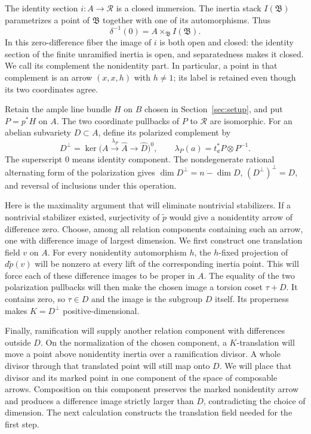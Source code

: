 The identity section \(i:A\to\mathcal R\) is a closed immersion.
The inertia stack \(I(\mathfrak B)\) parametrizes a point of
\(\mathfrak B\) together with one of its automorphisms.  Thus
\[
                   \delta^{-1}(0)
                       =A\times_{\mathfrak B}I(\mathfrak B).
\]
In this zero-difference fiber the image of \(i\) is both open and
closed: the identity section of the finite unramified inertia is
open, and separatedness makes it closed.  We call its complement
the nonidentity part.  In particular, a point in that complement is
an arrow \((x,x,h)\) with \(h\ne1\); its label is retained even though
its two coordinates agree.

Retain the ample line bundle \(H\) on \(B\) chosen in
Section~\ref{sec:setup}, and put \(P=p^*H\) on \(A\).  The two
coordinate pullbacks of \(P\) to \(\mathcal R\) are isomorphic.
For an abelian subvariety \(D\subset A\), define its polarized
complement by
\begin{equation}\label{quot:orthogonal}
 D^\perp
   =\ker\bigl(A\xrightarrow{\lambda_P}\widehat A
                      \longrightarrow\widehat D\bigr)^0,
 \qquad
 \lambda_P(a)=t_a^*P\otimes P^{-1}.
\end{equation}
The superscript \(0\) means identity component.  The nondegenerate
rational alternating form of the polarization gives
\(\dim D^\perp=n-\dim D\), \((D^\perp)^\perp=D\), and reversal of
inclusions under this operation.

Here is the maximality argument that will eliminate nontrivial stabilizers.
If a nontrivial stabilizer existed, surjectivity of \(\widetilde p\)
would give a nonidentity arrow of difference zero.  Choose, among all
relation components containing such an arrow, one with difference
image of largest dimension.  We first construct one translation field
\(v\) on \(A\).  For every nonidentity automorphism \(h\), the
\(h\)-fixed projection of \(d\widetilde p(v)\) will be nonzero at every
lift of the corresponding inertia point.  This will force each of
these difference images to be proper
in \(A\).  The equality of the two polarization pullbacks will then
make the chosen image a torsion coset \(\tau+D\).  It contains zero,
so \(\tau\in D\) and the image is the subgroup \(D\) itself.  Its
properness makes \(K=D^\perp\) positive-dimensional.

Finally, ramification will supply another relation component with
differences outside \(D\).  On the normalization of the chosen
component, a \(K\)-translation will move a point above nonidentity
inertia over a ramification divisor.  A whole divisor through that
translated point will still map onto \(D\).  We will
place that divisor and its marked point in one component of the space
of composable arrows.  Composition on this component preserves the
marked nonidentity arrow and produces a difference image strictly
larger than \(D\), contradicting the choice of dimension.  The next
calculation constructs the translation field needed for the first step.

